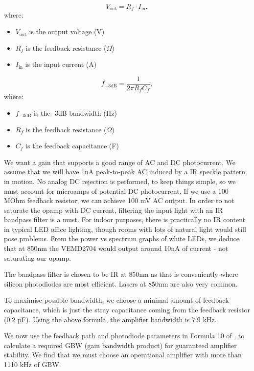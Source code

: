\begin{equation}
V_{\text{out}} = R_f \cdot I_{\text{in}},
\end{equation}
where:
\begin{itemize}
\item $V_{\text{out}}$ is the output voltage (V)
\item $R_f$ is the feedback resistance ($\Omega$)
\item $I_{\text{in}}$ is the input current (A)
\end{itemize}

\begin{equation}
f_{-3\text{dB}} = \frac{1}{2\pi R_f C_f},
\end{equation}
where:
\begin{itemize}
\item $f_{-3\text{dB}}$ is the -3dB bandwidth (Hz)
\item $R_f$ is the feedback resistance ($\Omega$)
\item $C_f$ is the feedback capacitance (F)
\end{itemize}

We want a gain that supports a good range of AC and DC photocurrent. We assume that we will have 1nA peak-to-peak AC induced by a IR speckle pattern in motion. No analog DC rejection is performed, to keep things simple, so we must account for microamps of potential DC photocurrent. If we use a 100 MOhm feedback resistor, we can achieve 100 mV AC output. In order to not saturate the opamp with DC current, filtering the input light with an IR bandpass filter is a must. For indoor purposes, there is practically no IR content in typical LED office lighting, though rooms with lots of natural light would still pose problems. From the power vs spectrum graphs of white LEDs, we deduce that at 850nm the VEMD2704 would output around 10nA of current - not saturating our opamp.

The bandpass filter is chosen to be IR at 850nm as that is conveniently where silicon photodiodes are most efficient. Lasers at 850nm are also very common.
 
To maximise possible bandwidth, we choose a minimal amount of feedback capacitance, which is just the stray capacitance coming from the feedback resistor (0.2 pF). Using the above formula, the amplifier bandwidth is 7.9 kHz. 

We now use the feedback path and photodiode parameters in Formula 10 of \cite{TIABW}, to calculate a required GBW (gain bandwidth product) for guaranteed amplifier stability. We find that we must choose an operational amplifier with more than 1110 kHz of GBW.

